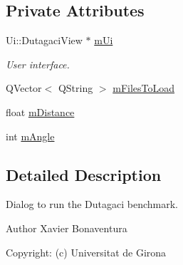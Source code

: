 \subsection*{Private Attributes}
\begin{DoxyCompactItemize}
\item 
Ui\+::\+Dutagaci\+View $\ast$ \hyperlink{class_dutagaci_dialog_a3ce0e7c4ba85b03b92859701b5f9cfc4}{m\+Ui}
\begin{DoxyCompactList}\small\item\em User interface. \end{DoxyCompactList}\item 
Q\+Vector$<$ Q\+String $>$ \hyperlink{class_dutagaci_dialog_a4a1130da190ed6fb4a941bb2236d219c}{m\+Files\+To\+Load}
\item 
float \hyperlink{class_dutagaci_dialog_a5aa43ab7213d5a88caad384c94141cbf}{m\+Distance}
\item 
int \hyperlink{class_dutagaci_dialog_acf6158ec2765efe1c6b8d4ef94eb14ff}{m\+Angle}
\end{DoxyCompactItemize}


\subsection{Detailed Description}
Dialog to run the Dutagaci benchmark. 

\begin{DoxyAuthor}{Author}
Xavier Bonaventura 

Copyright\+: (c) Universitat de Girona 
\end{DoxyAuthor}


